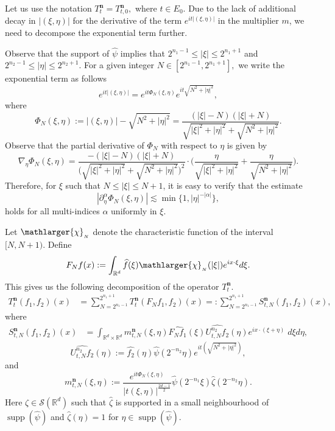 \documentclass[a4paper,reqno]{amsart}
\newcounter{old}
\numberwithin{equation}{section}
\newcommand{\R}{{\mathbb {R}}}
\newcommand{\supp}{\operatorname{supp}}
\begin{document}
	Let us use the notation $T^{\mathbf{n}}_{t}=T^{\mathbf{n}}_{t,0},$ where $t\in E_0$. Due to the lack of additional decay in $|(\xi,\eta)|$ for the derivative of the term $e^{it|(\xi,\eta)|}$ in the multiplier $m$, we need to decompose the exponential term further.
	
	Observe that the support of $\widehat{\psi}$ implies that $2^{n_1-1}\leq|\xi|\leq2^{n_1+1}$ and $2^{n_2-1}\leq|\eta|\leq2^{n_2+1}$. For a given integer $N\in [2^{n_1-1},2^{n_1+1}],$ we write the exponential term as follows 
	\[
	e^{it|(\xi,\eta)|}=e^{it\Phi_N(\xi,\eta)}e^{it\sqrt{N^2+|\eta|^2}},\]
	where
	\[\Phi_N(\xi,\eta):=|(\xi,\eta)|-\sqrt{N^2+|\eta|^2}=\frac{(|\xi|-N)(|\xi|+N)}{\sqrt{|\xi|^2+|\eta|^2}+\sqrt{N^2+|\eta|^2}}.\]
	Observe that the partial derivative of $\Phi_N$ with respect to $\eta$ is given by
	\[\nabla_\eta\Phi_N(\xi,\eta)=\frac{-(|\xi|-N)(|\xi|+N)}{\big(\sqrt{|\xi|^2+|\eta|^2}+\sqrt{N^2+|\eta|^2}\big)^2}\cdot \Big(\frac{\eta}{\sqrt{|\xi|^2+|\eta|^2}}+\frac{\eta}{\sqrt{N^2+|\eta|^2}}\Big).\]
	Therefore, for $\xi$ such that $N\leq|\xi|\leq N+1$, it is easy to verify that the estimate 
	\begin{equation}\label{deri}
		|\partial^\alpha_\eta\Phi_N(\xi,\eta)|\lesssim\min\{1,|\eta|^{-|\alpha|}\},
	\end{equation}
	holds for all multi-indices $\alpha$ uniformly in $\xi$. 
	
	Let $\mathlarger{\chi}_{_N}$ denote the characteristic function of the interval $[N, N+1)$. Define 
	\begin{equation}\label{operatorF}
		F_Nf(x) :=\int_{\mathbb{R}^{d}} \widehat{f}(\xi) \mathlarger{\chi}_{_N}(|\xi|) e^{i x \cdot \xi} d \xi.
	\end{equation}
	This gives us the following decomposition of the operator $T^{\mathbf{n}}_{t}$.
	\begin{align*}
		T^{\mathbf{n}}_{t}(f_1,f_2)(x)&
		=\sum_{N=2^{n_1-1}}^{2^{n_1+1}}T^{\mathbf{n}}_{t}(F_Nf_1,f_2)(x)=:\sum_{N=2^{n_1-1}}^{2^{n_1+1}}S^{\mathbf{n}}_{t,N}(f_1,f_2)(x),
	\end{align*}
	where
	\begin{align}\label{operatorTN}
		S^{\mathbf{n}}_{t,N}(f_1,f_2)(x)&=\int_{\R^d\times\R^d}m_{t,N}^{\mathbf{n}}(\xi,\eta)\widehat{F_Nf_1}(\xi)\widehat{U_{t,N}^{n_2}f_2}(\eta)e^{ix\cdot(\xi+\eta)}\;d\xi d\eta,
	\end{align}
	\begin{equation}\label{operatorU}
		\widehat{U_{t,N}^{n_2}f_2}(\eta):=\widehat{f_2}(\eta) \widehat{\psi}\left(2^{-n_2} \eta\right) e^{it\left(\sqrt{N^{2}+|\eta|^{2}}\right)},
	\end{equation}
	and
	\[m_{t,N}^{\mathbf{n}}(\xi, \eta) :=\frac{e^{it\Phi_N(\xi,\eta)}}{|t(\xi,\eta)|^{\frac{2d-1}{2}}}\widehat{\psi}\left(2^{-n_1} \xi\right) \widehat{\zeta}\left(2^{-n_2} \eta\right).\]
	Here $\zeta\in\mathcal{S}(\R^d)$ such that $\widehat{\zeta}$ is supported in a small neighbourhood of $\supp(\widehat{\psi})$ and $\widehat{\zeta}(\eta)=1$ for $\eta\in\supp(\widehat{\psi})$.
	
\end{document}
